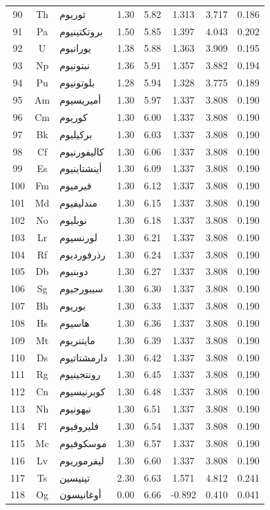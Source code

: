 \documentclass[12pt,a4paper]{article}
\theoremstyle{remark}
\begin{document}
\begin{longtable}{|c|c|p{2.5cm}|c|c|c|c|c|}
		90 & Th & ثوريوم        & 1.30 & 5.82 & 1.313  & 3.717  & 0.186 \\
		91 & Pa & بروتكتينيوم   & 1.50 & 5.85 & 1.397  & 4.043  & 0.202 \\
		92 & U  & يورانيوم      & 1.38 & 5.88 & 1.363  & 3.909  & 0.195 \\
		93 & Np & نبتونيوم      & 1.36 & 5.91 & 1.357  & 3.882  & 0.194 \\
		94 & Pu & بلوتونيوم     & 1.28 & 5.94 & 1.328  & 3.775  & 0.189 \\
		95 & Am & أميريسيوم     & 1.30 & 5.97 & 1.337  & 3.808  & 0.190 \\
		96 & Cm & كوريوم        & 1.30 & 6.00 & 1.337  & 3.808  & 0.190 \\
		97 & Bk & بركيليوم      & 1.30 & 6.03 & 1.337  & 3.808  & 0.190 \\
		98 & Cf & كاليفورنيوم   & 1.30 & 6.06 & 1.337  & 3.808  & 0.190 \\
		99 & Es & أينشتاينيوم   & 1.30 & 6.09 & 1.337  & 3.808  & 0.190 \\
		100& Fm & فيرميوم       & 1.30 & 6.12 & 1.337  & 3.808  & 0.190 \\
		101& Md & مندليفيوم     & 1.30 & 6.15 & 1.337  & 3.808  & 0.190 \\
		102& No & نوبليوم       & 1.30 & 6.18 & 1.337  & 3.808  & 0.190 \\
		103& Lr & لورنسيوم      & 1.30 & 6.21 & 1.337  & 3.808  & 0.190 \\
		104& Rf & رذرفورديوم    & 1.30 & 6.24 & 1.337  & 3.808  & 0.190 \\
		105& Db & دوبنيوم       & 1.30 & 6.27 & 1.337  & 3.808  & 0.190 \\
		106& Sg & سيبورجيوم     & 1.30 & 6.30 & 1.337  & 3.808  & 0.190 \\
		107& Bh & بوريوم        & 1.30 & 6.33 & 1.337  & 3.808  & 0.190 \\
		108& Hs & هاسيوم        & 1.30 & 6.36 & 1.337  & 3.808  & 0.190 \\
		109& Mt & مايتنريوم     & 1.30 & 6.39 & 1.337  & 3.808  & 0.190 \\
		110& Ds & دارمشتاتيوم   & 1.30 & 6.42 & 1.337  & 3.808  & 0.190 \\
		111& Rg & رونتجينيوم    & 1.30 & 6.45 & 1.337  & 3.808  & 0.190 \\
		112& Cn & كوبرنيسيوم    & 1.30 & 6.48 & 1.337  & 3.808  & 0.190 \\
		113& Nh & نيهونيوم      & 1.30 & 6.51 & 1.337  & 3.808  & 0.190 \\
		114& Fl & فليروفيوم     & 1.30 & 6.54 & 1.337  & 3.808  & 0.190 \\
		115& Mc & موسكوفيوم     & 1.30 & 6.57 & 1.337  & 3.808  & 0.190 \\
		116& Lv & ليفرموريوم    & 1.30 & 6.60 & 1.337  & 3.808  & 0.190 \\
		117& Ts & تينيسين       & 2.30 & 6.63 & 1.571  & 4.812  & 0.241 \\
		118& Og & أوغانيسون     & 0.00 & 6.66 & -0.892 & 0.410  & 0.041 \\
		\hline
	\end{longtable}
	
\end{document}
